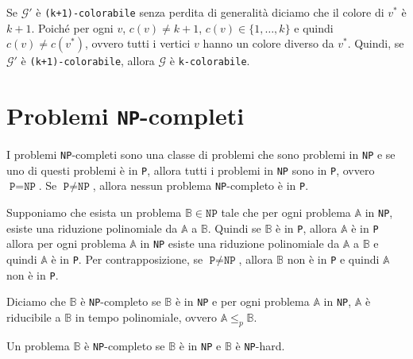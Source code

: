     Se $\mathcal{G}'$ è \texttt{(k+1)-colorabile} senza perdita di generalità diciamo che il colore di $v^*$ è $k+1$.
    Poiché per ogni $v$, $c(v) \neq k+1$, $c(v) \in \{1,\dots,k\}$ e quindi $c(v) \neq c(v^*)$, ovvero tutti i vertici $v$ hanno un colore diverso
    da $v^*$. Quindi, se $\mathcal{G'}$ è \texttt{(k+1)-colorabile},
    allora $\mathcal{G}$ è \texttt{k-colorabile}.
\section{Problemi \texttt{NP}-completi}
I problemi \texttt{NP}-completi sono una classe di problemi che sono problemi in \texttt{NP} e se uno 
di questi problemi è in \texttt{P}, allora tutti i problemi in \texttt{NP} sono in \texttt{P}, 
ovvero $\texttt{P} = \texttt{NP}$. Se $\texttt{P} \neq \texttt{NP}$, allora nessun problema
\texttt{NP}-completo è in \texttt{P}.
\begin{figure}[H]
    \centering
\end{figure}
Supponiamo che esista un problema $\mathbb{B}\in \texttt{NP}$ tale che per ogni problema $\mathbb{A}$ in \texttt{NP},
esiste una riduzione polinomiale da $\mathbb{A}$ a $\mathbb{B}$. 
Quindi se $\mathbb{B}$ è in \texttt{P}, allora $\mathbb{A}$ è in \texttt{P} allora 
per ogni problema $\mathbb{A}$ in \texttt{NP} esiste una riduzione polinomiale da
$\mathbb{A}$ a $\mathbb{B}$ e quindi $\mathbb{A}$ è in \texttt{P}.
Per contrapposizione, se $\texttt{P} \neq \texttt{NP}$,
allora $\mathbb{B}$ non è in \texttt{P} e quindi $\mathbb{A}$ non è in \texttt{P}.

Diciamo che $\mathbb{B}$ è \texttt{NP}-completo se $\mathbb{B}$ è in \texttt{NP} e
per ogni problema $\mathbb{A}$ in \texttt{NP}, $\mathbb{A}$ è riducibile a $\mathbb{B}$ in tempo polinomiale, 
ovvero $\mathbb{A} \leq_p \mathbb{B}$. 

\begin{tcolorbox}
    Un problema $\mathbb{B}$ è \texttt{NP}-completo se $\mathbb{B}$ è in \texttt{NP}
    e $\mathbb{B}$ è \texttt{NP}-hard.
\end{tcolorbox}

